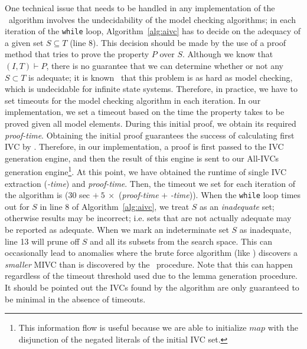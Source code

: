 One technical issue that needs to
be handled in any implementation of the \aivcalg ~algorithm involves the undecidability of the model checking algorithms;
in each iteration of the \texttt{while} loop, Algorithm~\ref{alg:aivc}
has to decide on the adequacy of a given set $S \subseteq T$ (line 8).
This decision should be made by the use of a proof method that
tries to prove the property $P$ over $S$. Although we know that $(I, T) \vdash P$,
there is no guarantee that we can determine whether or not any $S \subset T$ is adequate; it is known~\cite{Ghass16} that
this problem is as hard as model checking, which is undecidable for infinite state systems.
Therefore, in practice, we have to set timeouts for the model checking algorithm in each iteration.
In our implementation, we set a timeout based on the time the property takes to be proved given all model elements.
During this initial proof, we obtain its required \emph{proof-time}.
Obtaining the initial proof guarantees the success of calculating first IVC by \ucalg.
Therefore, in our implementation, a proof is first passed to the IVC generation engine, and then the result of this engine is sent to our All-IVCs generation engine\footnote{This information flow is useful because we are able to initialize $map$ with the disjunction of the negated literals of the initial IVC set.}.
At this point, we have obtained the runtime of single IVC extraction (\emph{\ucalg-time}) and \emph{proof-time}.
Then, the timeout we set for each iteration of the algorithm is ($30$ sec  $+\ 5\ \times$ (\emph{proof-time} $+$ \emph{\ucalg-time})).
When the \texttt{while} loop times out for $S$ in line 8 of Algorithm~\ref{alg:aivc},
we treat $S$ as an \emph{inadequate} set;
otherwise results may be incorrect; i.e. sets that are not actually adequate may be reported as adequate.
When we mark an indeterminate set $S$ as inadequate, line 13 will prune off $S$ and all its subsets from
the search space.  This can occasionally lead to anomalies where the brute force algorithm (like \ucbfalg) discovers a {\em smaller}
MIVC than is discovered by the \aivcalg ~procedure.  Note that this can happen regardless of the timeout threshold used
due to the lemma generation procedure. It should be pointed out the IVCs found by the algorithm are only guaranteed to be minimal in the absence of timeouts.


%

